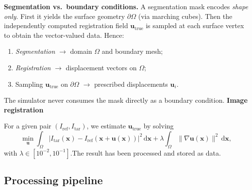 \documentclass{article}
\begin{document}
\textbf{Segmentation vs.\ boundary conditions.}  
A segmentation mask encodes \emph{shape only}. First it yields the surface geometry $\partial\Omega$ (via marching cubes). Then the independently computed registration field $\mathbf{u}_{\mathrm{true}}$ is sampled at each surface vertex to obtain the vector-valued data. Hence:
\begin{enumerate}
  \item \emph{Segmentation} $\longrightarrow$ domain $\Omega$ and boundary mesh;
  \item \emph{Registration} $\longrightarrow$ displacement vectors on $\Omega$;
  \item Sampling $\mathbf{u}_{\mathrm{true}}$ on $\partial\Omega$ $\longrightarrow$ prescribed displacements $\mathbf{u}_i$.
\end{enumerate}
The simulator never consumes the mask directly as a boundary condition.
\newline
\textbf{Image registration}


For a given pair $(I_{\mathrm{ref}}, I_{\mathrm{tar}})$, we estimate $\mathbf{u}_{\mathrm{true}}$ by solving
\begin{equation}
\label{eq:registration}
\min_{\mathbf{u}}
  \int_{\Omega} \bigl|I_{\mathrm{tar}}(\mathbf{x}) - I_{\mathrm{ref}}(\mathbf{x} + \mathbf{u}(\mathbf{x}))\bigr|^2 \,\mathrm{d}\mathbf{x}
  + \lambda \int_{\Omega} \lVert\nabla \mathbf{u}(\mathbf{x})\rVert^2 \,\mathrm{d}\mathbf{x},
\end{equation}
with $\lambda\in[10^{-2},10^{-1}]$.The result has been processed and stored as data. 



\subsection{Processing pipeline}
\label{ssec:pipeline}
\end{document}
